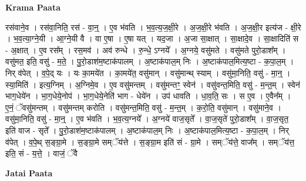 \documentclass[17pt]{extarticle}
\begin{document}
\textbf{Krama Paata} \newline

रस॑वाने॒व । रस॑वा॒निति॒ रस॑ - वा॒न्॒ । ए॒व भ॑वति । भ॒व॒त्य॒ज॒क्षी॒रे । अ॒ज॒क्षी॒रे भ॑वति । अ॒ज॒क्षी॒र इत्य॑ज - क्षी॒रे । भ॒व॒त्या॒ग्ने॒यी । आ॒ग्ने॒यी वै । वा ए॒षा । ए॒षा यत् । यद॒जा । अ॒जा सा॒क्षात् । सा॒क्षादे॒व । सा॒क्षादिति॑ स - अ॒क्षात् । ए॒व रस᳚म् । रस॒मव॑ । अव॑ रुन्धे । रु॒न्धे॒ ऽग्नये᳚ । अ॒ग्नये॒ वसु॑मते । वसु॑मते पुरो॒डाश᳚म् । वसु॑मत॒ इति॒ वसु॑ - म॒ते॒ । पु॒रो॒डाश॑म॒ष्टाक॑पालम् । अ॒ष्टाक॑पाल॒म् निः । अ॒ष्टाक॑पाल॒मित्य॒ष्टा - क॒पा॒ल॒म् । निर् व॑पेत् । व॒पे॒द् यः । यः का॒मये॑त । का॒मये॑त॒ वसु॑मान् । वसु॑मान्थ् स्याम् । वसु॑मा॒निति॒ वसु॑ - मा॒न्॒ । स्या॒मिति॑ । इत्य॒ग्निम् । अ॒ग्निमे॒व । ए॒व वसु॑मन्तम् । वसु॑मन्तꣳ॒॒ स्वेन॑ । वसु॑वन्त॒मिति॒ वसु॑ - म॒न्त॒॒म् । स्वेन॑ भाग॒धेये॑न । भा॒ग॒धेये॒नोप॑ । भा॒ग॒धेये॒नेति॑ भाग - धेये॑न । उप॑ धावति । धा॒व॒ति॒ सः । स ए॒व । ए॒वैन᳚म् । ए॒नं॒ ॅवसु॑मन्तम् । वसु॑मन्तम् करोति । वसु॑मन्त॒मिति॒ वसु॑ - म॒न्त॒॒म् । क॒रो॒ति॒ वसु॑मान् । वसु॑माने॒व । वसु॑मा॒निति॒ वसु॑ - मा॒न्॒ । ए॒व भ॑वति । भ॒व॒त्य॒ग्नये᳚ । अ॒ग्नये॑ वाज॒सृते᳚ । वा॒ज॒सृते॑ पुरो॒डाश᳚म् । वा॒ज॒सृत॒ इति॑ वाज - सृते᳚ । पु॒रो॒डाश॑म॒ष्टाक॑पालम् । अ॒ष्टाक॑पाल॒म् निः । अ॒ष्टाक॑पाल॒मित्य॒ष्टा - क॒पा॒ल॒म् । निर् व॑पेत् । व॒पे॒थ् स॒ङ्ग्रा॒मे । स॒ङ्ग्रा॒मे सम्ॅय॑त्ते । स॒ङ्ग्रा॒म इति॑ सं - ग्रा॒मे । सम्ॅय॑त्ते॒ वाज᳚म् । सम्ॅय॑त्त॒ इति॒ सं - य॒त्ते॒ । वाजं॒ ॅवै \newline

\textbf{Jatai Paata} \newline
\end{document}
